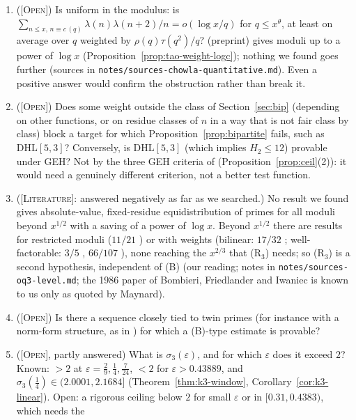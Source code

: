 \documentclass[11pt]{amsart}
\theoremstyle{definition}
\theoremstyle{remark}
\newcommand{\lbl}[1]{\textup{\textsc{[#1]}}}
\begin{document}
\begin{enumerate}
\item\label{oq:uniform} (\lbl{Open}) Is \cite[Theorem~1.2]{Tao16} uniform in the
  modulus: is $\sum_{n\le x,\,n\equiv c\,(q)}\lambda(n)\lambda(n+2)/n=o(\log x/q)$ for
  $q\le x^{\theta}$, at least on average over $q$ weighted by $\rho(q)\tau(q^2)/q$?
  \cite[Theorem~3.1]{TT25} (preprint) gives moduli up to a power of $\log x$
  (Proposition~\ref{prop:tao-weight-logc}); nothing we found goes further
  (sources in \texttt{notes/sources-chowla-quantitative.md}). Even a positive
  answer would confirm the obstruction rather than break it.
\item (\lbl{Open}) Does some weight outside the class of Section~\ref{sec:bip}
  (depending on other functions, or on residue classes of $n$ in a way that is
  not fair class by class) block a target for which
  Proposition~\ref{prop:bipartite} fails, such as $\mathrm{DHL}[5,3]$?
  Conversely, is $\mathrm{DHL}[5,3]$ (which implies $H_2\le12$) provable under
  GEH? Not by the three GEH criteria of \cite{PM8b}
  (Proposition~\ref{prop:ceil}(2)): it would need a genuinely different
  criterion, not a better test function.
\item\label{oq:level} (\lbl{Literature}: answered negatively as far as we searched.)
  No result we found gives absolute-value, fixed-residue equidistribution of
  primes for all moduli beyond $x^{1/2}$ with a saving of a power of $\log x$.
  Beyond $x^{1/2}$ there are results for restricted moduli ($11/21$
  \cite[Theorem~1.1]{Ma20}) or with weights (bilinear: $17/32$ \cite{Li23};
  well-factorable: $3/5$ \cite{Ma20}, $66/107$ \cite{Li23}), none reaching the
  $x^{2/3}$ that (R$_3$) needs; so (R$_3$) is a second hypothesis, independent
  of (B) (our reading; notes in \texttt{notes/}\allowbreak\texttt{sources-oq3-level.md};
  the 1986 paper of Bombieri, Friedlander and Iwaniec is known to us only as
  quoted by Maynard).
\item (\lbl{Open}) Is there a sequence closely tied to twin primes (for instance with a
  norm-form structure, as in \cite{FI98b}) for which a (B)-type estimate is
  provable?
\item (\lbl{Open}, partly answered) What is $\sigma_3(\varepsilon)$, and for which
  $\varepsilon$ does it exceed $2$? Known: $>2$ at $\varepsilon=\frac29,\frac14,\frac7{24}$, $<2$
  for $\varepsilon>0.43889$, and $\sigma_3(\frac14)\in(2.0001,2.1684]$
  (Theorem~\ref{thm:k3-window}, Corollary~\ref{cor:k3-linear}). Open: a rigorous
  ceiling below $2$ for small $\varepsilon$ or in $[0.31,0.4383)$, which needs the

\end{enumerate}
\end{document}
